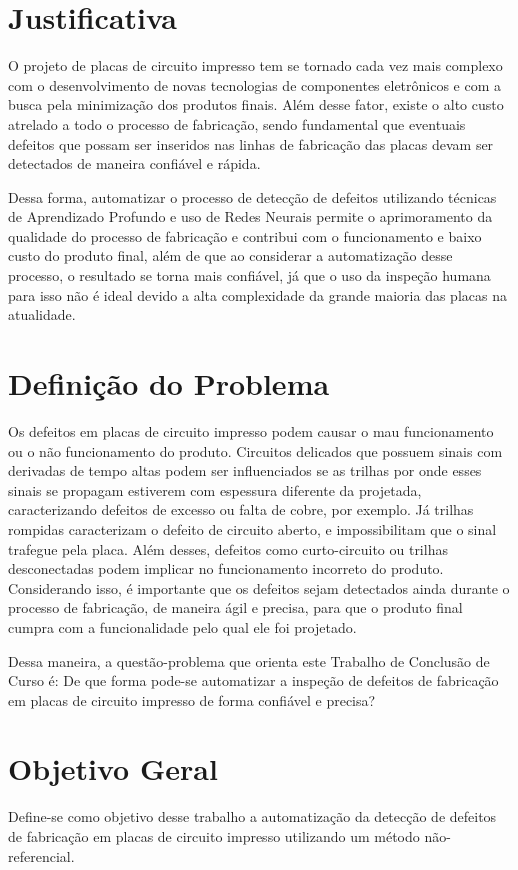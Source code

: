 \section{Justificativa}
O projeto de placas de circuito impresso tem se tornado cada vez mais complexo com o desenvolvimento de novas tecnologias de componentes eletrônicos e com a busca pela minimização dos produtos finais.
Além desse fator, existe o alto custo atrelado a todo o processo de fabricação, sendo fundamental que eventuais defeitos que possam ser inseridos nas linhas de fabricação das placas devam ser detectados de maneira confiável e rápida.

Dessa forma, automatizar o processo de detecção de defeitos utilizando técnicas de Aprendizado Profundo e uso de Redes Neurais permite o aprimoramento da qualidade do processo de fabricação e contribui com o funcionamento e baixo custo do produto final, além de que ao considerar a automatização desse processo, o resultado se torna mais confiável, já que o uso da inspeção humana para isso não é ideal devido a alta complexidade da grande maioria das placas na atualidade.

\section{Definição do Problema}
Os defeitos em placas de circuito impresso podem causar o mau funcionamento ou o não funcionamento do produto. Circuitos delicados que possuem sinais com derivadas de tempo altas podem ser influenciados se as trilhas por onde esses sinais se propagam estiverem com espessura diferente da projetada, caracterizando defeitos de excesso ou falta de cobre, por exemplo. Já trilhas rompidas caracterizam o defeito de circuito aberto, e impossibilitam que o sinal trafegue pela placa. Além desses, defeitos como curto-circuito ou trilhas desconectadas podem implicar no funcionamento incorreto do produto. Considerando isso, é importante que os defeitos sejam detectados ainda durante o processo de fabricação, de maneira ágil e precisa, para que o produto final cumpra com a funcionalidade pelo qual ele foi projetado.

Dessa maneira, a questão-problema que orienta este Trabalho de Conclusão de Curso é: De que forma pode-se automatizar a inspeção de defeitos de fabricação em placas de circuito impresso de forma confiável e precisa?

\section{Objetivo Geral}
Define-se como objetivo desse trabalho a automatização da detecção de defeitos de fabricação em placas de circuito impresso utilizando um método não-referencial.

